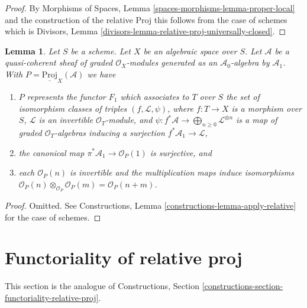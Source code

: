 \documentclass{stacks-project}
\theoremstyle{plain}
\newtheorem{lemma}[subsection]{Lemma}
\theoremstyle{definition}
\theoremstyle{remark}
\numberwithin{equation}{subsection}
\begin{document}
\begin{proof}
By Morphisms of Spaces, Lemma
\ref{spaces-morphisms-lemma-proper-local}
and the construction of the relative Proj this follows from the
case of schemes which is
Divisors, Lemma \ref{divisors-lemma-relative-proj-universally-closed}.
\end{proof}

\begin{lemma}
\label{lemma-relative-proj-generated-in-degree-1}
Let $S$ be a scheme. Let $X$ be an algebraic space over $S$.
Let $\mathcal{A}$ be a quasi-coherent sheaf of graded $\mathcal{O}_X$-modules
generated as an $\mathcal{A}_0$-algebra by $\mathcal{A}_1$.
With $P = \underline{\text{Proj}}_X(\mathcal{A})$ we have
\begin{enumerate}
\item $P$ represents the functor $F_1$ which associates to
$T$ over $S$ the set of isomorphism classes of
triples $(f, \mathcal{L}, \psi)$, where $f : T \to X$ is a morphism
over $S$, $\mathcal{L}$ is an invertible $\mathcal{O}_T$-module, and
$\psi : f^*\mathcal{A} \to \bigoplus_{n \geq 0} \mathcal{L}^{\otimes n}$
is a map of graded $\mathcal{O}_T$-algebras inducing a surjection
$f^*\mathcal{A}_1 \to \mathcal{L}$,
\item the canonical map $\pi^*\mathcal{A}_1 \to \mathcal{O}_P(1)$ is
surjective, and
\item each $\mathcal{O}_P(n)$ is invertible
and the multiplication maps induce isomorphisms
$\mathcal{O}_P(n) \otimes_{\mathcal{O}_P} \mathcal{O}_P(m) =
\mathcal{O}_P(n + m)$.
\end{enumerate}
\end{lemma}

\begin{proof}
Omitted.
See Constructions, Lemma \ref{constructions-lemma-apply-relative}
for the case of schemes.
\end{proof}







\section{Functoriality of relative proj}
\label{section-functoriality-relative-proj}

\noindent
This section is the analogue of
Constructions, Section \ref{constructions-section-functoriality-relative-proj}.
\end{document}
